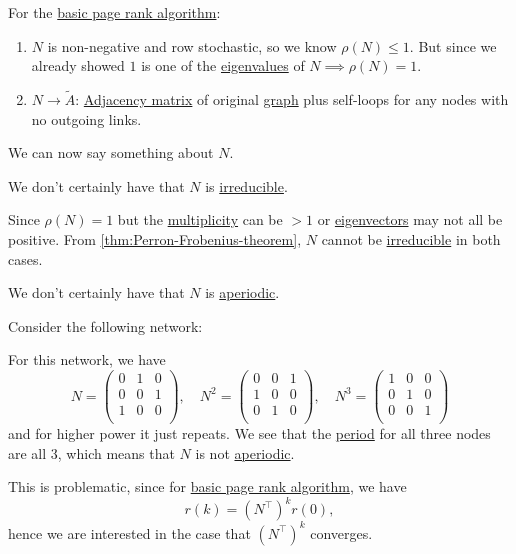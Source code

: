 \begin{prev}
	For the \hyperref[algo:basic-page-rank-algorithm]{basic page rank algorithm}:
	\begin{enumerate}
		\item \(N\) is non-negative and row stochastic, so we know \(\rho (N) \leq 1\). But since we already showed \(1\) is one of the \hyperref[def:eigenvalue]{eigenvalues} of \(N \implies \rho(N) = 1\).
		\item \(N \to \widetilde{A}\): \hyperref[def:adjacency-matrix]{Adjacency matrix} of original \hyperref[def:graph]{graph} plus self-loops for any nodes with no outgoing links.
	\end{enumerate}
\end{prev}

We can now say something about \(N\).

\begin{remark}
	We don't certainly have that \(N\) is \hyperref[def:irreducible]{irreducible}.
\end{remark}
\begin{explanation}
	Since \(\rho (N) = 1\) but the \hyperref[def:multiplicity]{multiplicity} can be \(> 1\) or \hyperref[def:eigenvector]{eigenvectors} may not all be positive. From \autoref{thm:Perron-Frobenius-theorem}, \(N\) cannot be \hyperref[def:irreducible]{irreducible} in both cases.
\end{explanation}

\begin{remark}
	We don't certainly have that \(N\) is \hyperref[def:aperiodic]{aperiodic}.
\end{remark}
\begin{explanation}
	Consider the following network:
	\begin{center}
	\end{center}
	For this network, we have
	\[
		N=\begin{pmatrix}
			0 & 1 & 0 \\
			0 & 0 & 1 \\
			1 & 0 & 0 \\
		\end{pmatrix},\quad N^2 = \begin{pmatrix}
			0 & 0 & 1 \\
			1 & 0 & 0 \\
			0 & 1 & 0 \\
		\end{pmatrix}, \quad N^3 = \begin{pmatrix}
			1 & 0 & 0 \\
			0 & 1 & 0 \\
			0 & 0 & 1 \\
		\end{pmatrix}
	\]
	and for higher power it just repeats. We see that the \hyperref[def:period]{period} for all three nodes	are all \(3\), which means that \(N\) is not \hyperref[def:aperiodic]{aperiodic}.
\end{explanation}
This is problematic, since for \hyperref[algo:basic-page-rank-algorithm]{basic page rank algorithm}, we have
\[
	r(k) = (N^{\top} )^k r(0),
\]
hence we are interested in the case that \((N^{\top})^k\) converges.

